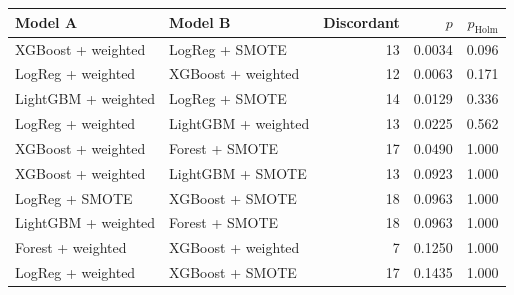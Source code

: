 \begin{tabular}{l l r r r}
\hline
\textbf{Model A} & \textbf{Model B} & \textbf{Discordant} & \textbf{$p$} & \textbf{$p_{\mathrm{Holm}}$} \\
\hline
XGBoost + weighted & LogReg + SMOTE & 13 & 0.0034 & 0.096 \\
LogReg + weighted & XGBoost + weighted & 12 & 0.0063 & 0.171 \\
LightGBM + weighted & LogReg + SMOTE & 14 & 0.0129 & 0.336 \\
LogReg + weighted & LightGBM + weighted & 13 & 0.0225 & 0.562 \\
XGBoost + weighted & Forest + SMOTE & 17 & 0.0490 & 1.000 \\
XGBoost + weighted & LightGBM + SMOTE & 13 & 0.0923 & 1.000 \\
LogReg + SMOTE & XGBoost + SMOTE & 18 & 0.0963 & 1.000 \\
LightGBM + weighted & Forest + SMOTE & 18 & 0.0963 & 1.000 \\
Forest + weighted & XGBoost + weighted & 7 & 0.1250 & 1.000 \\
LogReg + weighted & XGBoost + SMOTE & 17 & 0.1435 & 1.000 \\
\hline
\end{tabular}